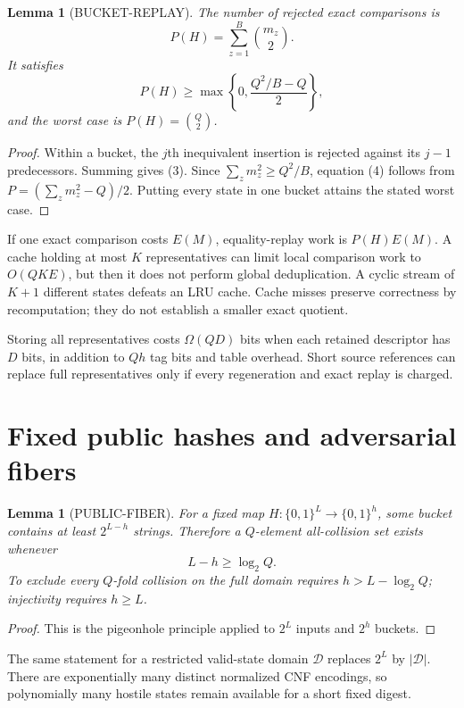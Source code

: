 \documentclass[11pt]{article}
\newtheorem{lemma}[theorem]{Lemma}
\begin{document}
\begin{lemma}[BUCKET-REPLAY]
The number of rejected exact comparisons is
\[
 P(H)=\sum_{z=1}^{B}\binom{m_z}{2}.
 \tag{3}
\]
It satisfies
\[
 P(H)\ge
 \max\left\{0,\frac{Q^2/B-Q}{2}\right\},
 \tag{4}
\]
and the worst case is $P(H)=\binom Q2$.
\end{lemma}

\begin{proof}
Within a bucket, the $j$th inequivalent insertion is rejected against its
$j-1$ predecessors.  Summing gives (3).  Since
$\sum_zm_z^2\ge Q^2/B$, equation (4) follows from
$P=(\sum_zm_z^2-Q)/2$.  Putting every state in one bucket attains the stated
worst case.
\end{proof}

If one exact comparison costs $E(M)$, equality-replay work is
$P(H)E(M)$.  A cache holding at most $K$ representatives can limit local
comparison work to $O(QK E)$, but then it does not perform global
deduplication.  A cyclic stream of $K+1$ different states defeats an LRU
cache.  Cache misses preserve correctness by recomputation; they do not
establish a smaller exact quotient.

Storing all representatives costs $\Omega(QD)$ bits when each retained
descriptor has $D$ bits, in addition to $Qh$ tag bits and table overhead.
Short source references can replace full representatives only if every
regeneration and exact replay is charged.

\section{Fixed public hashes and adversarial fibers}

\begin{lemma}[PUBLIC-FIBER]
For a fixed map $H:\{0,1\}^L\to\{0,1\}^h$, some bucket contains at least
$2^{L-h}$ strings.  Therefore a $Q$-element all-collision set exists whenever
\[
 L-h\ge\log_2Q.
 \tag{5}
\]
To exclude every $Q$-fold collision on the full domain requires
$h>L-\log_2Q$; injectivity requires $h\ge L$.
\end{lemma}

\begin{proof}
This is the pigeonhole principle applied to $2^L$ inputs and $2^h$ buckets.
\end{proof}

The same statement for a restricted valid-state domain $\mathcal D$ replaces
$2^L$ by $|\mathcal D|$.  There are exponentially many distinct normalized
CNF encodings, so polynomially many hostile states remain available for a
short fixed digest.
\end{document}

